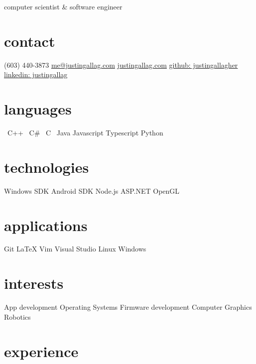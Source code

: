 \documentclass[print]{template/friggeri-cv}
\newcommand{\starr}{\raisebox{0.2ex}{$\star $}}
\begin{document}
    {computer scientist \& software engineer}

    \begin{aside}
        \section{contact}
            (603) 440-3873
            \href{mailto:me@justingallag.com}{me@justingallag.com}
            \href{http://justingallag.com}{justingallag.com}
            \href{https://github.com/justingallagher}{github: justingallagher}
            \href{https://www.linkedin.com/in/justingallag}{linkedin: justingallag}
        \section{languages}
            \starr \ C++
            \starr \ C\#
            \starr \ C
            \starr \ Java
            Javascript
            Typescript
            Python
        \section{technologies}
            Windows SDK
            Android SDK
            Node.js
            ASP.NET
            OpenGL
        \section{applications}
            Git
            LaTeX
            Vim
            Visual Studio
            Linux
            Windows
        \section{interests}
            App development
            Operating Systems
            Firmware development
            Computer Graphics
            Robotics
    \end{aside}

    \section{experience}
\end{document}
